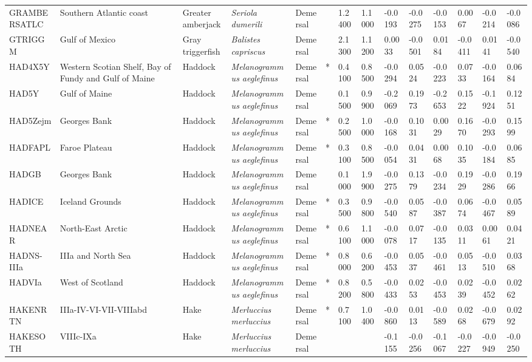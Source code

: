 \begin{longtable}{p{2.8cm}p{2cm}p{1.7cm}p{1.7cm}p{1cm}p{0.3cm}p{1cm}p{1cm}p{1cm}p{1cm}p{1cm}p{1cm}p{1cm}p{1cm}}
  GRAMBERSATLC & Southern Atlantic coast & Greater amberjack & \textit{Seriola dumerili} & Demersal &   & 1.2400 & 1.1000 & -0.0193 & -0.0275 & -0.0153 & 0.0067 & -0.0214 & -0.0086 \\ 
  GTRIGGM & Gulf of Mexico & Gray triggerfish & \textit{Balistes capriscus} & Demersal &   & 2.1300 & 1.1200 & 0.0033 & -0.0501 & 0.0184 & -0.0411 & 0.0141 & -0.0540 \\ 
  HAD4X5Y & Western Scotian Shelf, Bay of Fundy and Gulf of Maine & Haddock & \textit{Melanogrammus aeglefinus} & Demersal & * & 0.4100 & 0.8500 & -0.0294 & 0.0524 & -0.0223 & 0.0733 & -0.0164 & 0.0684 \\ 
  HAD5Y & Gulf of Maine & Haddock & \textit{Melanogrammus aeglefinus} & Demersal &   & 0.1500 & 0.9900 & -0.2069 & 0.1973 & -0.2653 & 0.1522 & -0.1924 & 0.1251 \\ 
  HAD5Zejm & Georges Bank & Haddock & \textit{Melanogrammus aeglefinus} & Demersal & * & 0.2500 & 1.0000 & -0.0168 & 0.1031 & 0.0029 & 0.1670 & -0.0293 & 0.1599 \\ 
  HADFAPL & Faroe Plateau & Haddock & \textit{Melanogrammus aeglefinus} & Demersal & * & 0.3100 & 0.8500 & -0.0054 & 0.0431 & 0.0068 & 0.1035 & -0.0184 & 0.0685 \\ 
  HADGB & Georges Bank & Haddock & \textit{Melanogrammus aeglefinus} & Demersal &   & 0.1000 & 1.9900 & -0.0275 & 0.1379 & -0.0234 & 0.1929 & -0.0286 & 0.1966 \\ 
  HADICE & Iceland Grounds & Haddock & \textit{Melanogrammus aeglefinus} & Demersal & * & 0.3500 & 0.9800 & -0.0540 & 0.0587 & -0.0387 & 0.0674 & -0.0467 & 0.0589 \\ 
  HADNEAR & North-East Arctic & Haddock & \textit{Melanogrammus aeglefinus} & Demersal & * & 0.6100 & 1.1000 & -0.0078 & 0.0717 & -0.0135 & 0.0311 & 0.0061 & 0.0421 \\ 
  HADNS-IIIa & IIIa and North Sea & Haddock & \textit{Melanogrammus aeglefinus} & Demersal & * & 0.8000 & 0.6200 & -0.0453 & 0.0537 & -0.0461 & 0.0513 & -0.0510 & 0.0368 \\ 
  HADVIa & West of Scotland & Haddock & \textit{Melanogrammus aeglefinus} & Demersal & * & 0.8200 & 0.5800 & -0.0433 & 0.0253 & -0.0453 & 0.0239 & -0.0452 & 0.0262 \\ 
  HAKENRTN & IIIa-IV-VI-VII-VIIIabd & Hake & \textit{Merluccius merluccius} & Demersal & * & 0.7100 & 1.0400 & -0.0860 & 0.0113 & -0.0589 & 0.0268 & -0.0679 & 0.0292 \\ 
  HAKESOTH & VIIIc-IXa & Hake & \textit{Merluccius merluccius} & Demersal &  &  &  & -0.1155 & -0.0256 & -0.1067 & -0.0227 & -0.0949 & -0.0250 \\ 

\end{longtable}
